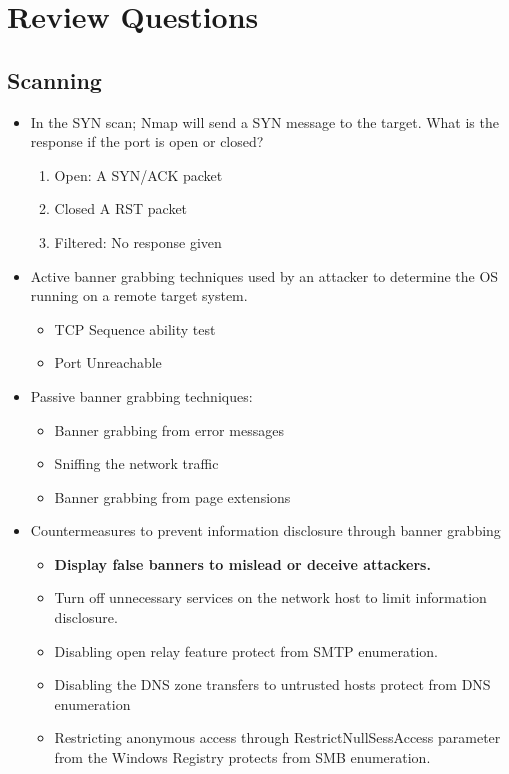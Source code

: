 \section{Review Questions}

\subsection{Scanning}
\begin{itemize}
    \item In the SYN scan; Nmap will send a SYN message to the target. What is the response if the port is open or closed?
    \begin{enumerate}
        \item Open: A SYN/ACK packet
        \item Closed A RST packet
        \item Filtered: No response given
    \end{enumerate}
    \item Active banner grabbing techniques used by an attacker to determine the OS running on a remote target system.
    \begin{itemize}
        \item TCP Sequence ability test
        \item Port Unreachable
    \end{itemize}
    \item Passive banner grabbing techniques:
    \begin{itemize}
        \item Banner grabbing from error messages
        \item Sniffing the network traffic
        \item Banner grabbing from page extensions
    \end{itemize}
    \item Countermeasures to prevent information disclosure through banner grabbing
    \begin{itemize}
        \item \textbf{Display false banners to mislead or deceive attackers.}
        \item Turn off unnecessary services on the network host to limit information disclosure.
        \item Disabling open relay feature protect from SMTP enumeration.
        \item Disabling the DNS zone transfers to untrusted hosts protect from DNS enumeration
        \item Restricting anonymous access through RestrictNullSessAccess parameter from the Windows Registry protects from SMB enumeration.
    \end{itemize}
\end{itemize}

